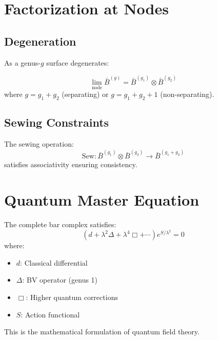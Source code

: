 \section{Factorization at Nodes}

\subsection{Degeneration}

As a genus-$g$ surface degenerates:

\begin{theorem}[Factorization]
$$\lim_{\text{node}} \bar{B}^{(g)} = \bar{B}^{(g_1)} \otimes \bar{B}^{(g_2)}$$
where $g = g_1 + g_2$ (separating) or $g = g_1 + g_2 + 1$ (non-separating).
\end{theorem}

\subsection{Sewing Constraints}

The sewing operation:
$$\text{Sew}: \bar{B}^{(g_1)} \otimes \bar{B}^{(g_2)} \to \bar{B}^{(g_1+g_2)}$$
satisfies associativity ensuring consistency.

\section{Quantum Master Equation}

\begin{theorem}
The complete bar complex satisfies:
$$(d + \lambda^2\Delta + \lambda^4\Box + \cdots)e^{S/\lambda^2} = 0$$
where:
\begin{itemize}
\item $d$: Classical differential
\item $\Delta$: BV operator (genus 1)
\item $\Box$: Higher quantum corrections
\item $S$: Action functional
\end{itemize}
\end{theorem}

This is the mathematical formulation of quantum field theory.